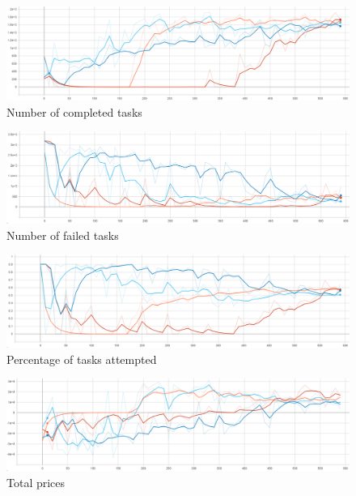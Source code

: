 \begin{figure}[H]
    \centering
    \includegraphics[width=\linewidth]{figures/5_evaluation_figs/env_training_fig/num_completed_tasks.png}
    \caption{Number of completed tasks}
    \label{fig:env_num_completed_tasks}
\end{figure}

\begin{figure}[H]
    \centering
    \includegraphics[width=\linewidth]{figures/5_evaluation_figs/env_training_fig/num_failed_tasks.png}
    \caption{Number of failed tasks}
    \label{fig:env_num_failed_tasks}
\end{figure}

\begin{figure}[H]
    \centering
    \includegraphics[width=\linewidth]{figures/5_evaluation_figs/env_training_fig/percent_tasks.png}
    \caption{Percentage of tasks attempted}
    \label{fig:env_percent_tasks}
\end{figure}

\begin{figure}[H]
    \centering
    \includegraphics[width=\linewidth]{figures/5_evaluation_figs/env_training_fig/total_prices.png}
    \caption{Total prices}
    \label{fig:env_total_prices}
\end{figure}

